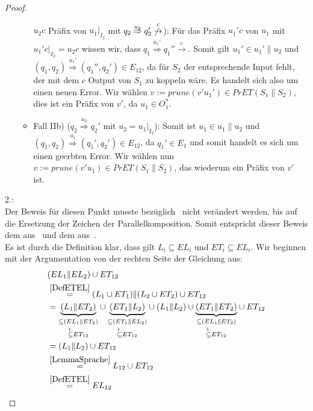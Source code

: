 \begin{proof}
\begin{itemize}
\begin{itemize}
        $u_2c$ Präfix von $u_1|_{I_2}$ mit $q_2 \overset{u_2}{\Rightarrow} q_2'
        \overset{c}{\not{\hspace{-0.1cm}\rightarrow}}$): Für das Präfix $u_1'c$
        von $u_1$ mit $u_1'c|_{I_2}=u_2c$ wissen wir, dass $q_1
        \overset{u_1'}{\Rightarrow} q_1'' \overset{c}{\rightarrow}$. Somit gilt
        $u_1'\in u_1'\|u_2$ und $(q_1,q_2) \overset{u_1'}{\Rightarrow}
        (q_1'',q_2')\in E_{12}$, da für $S_2$ der entsprechende Input fehlt,
        der mit dem $c$ Output von $S_1$ zu koppeln wäre. Es handelt sich also
        um einen neuen Error. Wir wählen $v:=prune(v'u_1')\in PrET(S_1\| S_2)$,
        dies ist ein Präfix von $v'$, da $u_1\in O_1^*$.
      \item Fall IIb) ($q_2 \overset{u_2}{\Rightarrow} q_2'$ mit
        $u_2=u_1|_{I_2}$): Somit ist $u_1\in u_1\|u_2$ und $(q_1,q_2)
        \overset{u_1}{\Rightarrow} (q_1',q_2')\in E_{12}$, da $q_1'\in E_1$ und
        somit handelt es sich um einen geerbten Error. Wir wählen nun $v:=prune
        (v'u_1)\in PrET(S_1\|S_2)$, das wiederum ein Präfix von $v'$ ist.
    \end{itemize}
  \end{itemize}

  2.:\\
  Der Beweis für diesen Punkt musste bezüglich~\cite{Vogler2014EIO} nicht
  verändert werden, bis auf die Ersetzung der Zeichen der Parallelkomposition.
  Somit entspricht dieser Beweis dem aus~\cite{Vogler2014EIO} und dem
  aus~\cite{Schlosser2012BA}.\\
  Es ist durch die Definition klar, dass gilt $L_i\subseteq EL_i$ und
  $ET_i\subseteq EL_i$. Wir beginnen mit der Argumentation von der rechten
  Seite der Gleichung aus:
  \begin{align*}
    &(EL_1\| EL_2)\cup ET_{12}\\
    &\overset{\ref{DefETEL}}{=}(L_1\cup ET_1)\|(L_2\cup ET_2)\cup ET_{12}\\
    &=\underset{\overset{1.}{\subseteq} ET_{12}}{\underset{\subseteq
    (EL_1\|ET_2)}{\underbrace{(L_1\|ET_2)}}} \cup
    \underset{\overset{1.}{\subseteq} ET_{12}}{\underset{\subseteq
    (ET_1\|EL_2)}{\underbrace{(ET_1\|L_2)}}} \cup
    (L_1\|L_2) \cup \underset{\overset{1.}{\subseteq}
    ET_{12}}{\underset{\subseteq (EL_1\|ET_2)}{\underbrace{(ET_1\|ET_2)}}} \cup
    ET_{12}\\
    &=(L_1\|L_2) \cup ET_{12}\\
    &\overset{\ref{LemmaSprache}}{=}L_{12}\cup ET_{12}\\
    &\overset{\ref{DefETEL}}{=}EL_{12}
  \end{align*}
\end{proof}

